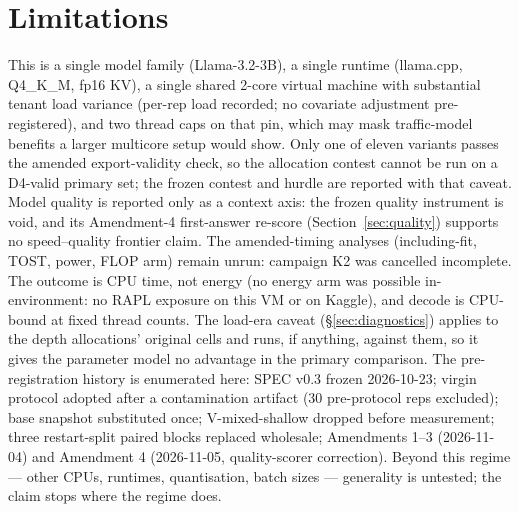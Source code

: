 \documentclass[10pt,letterpaper,twocolumn]{article}
\begin{document}
\section{Limitations}
\label{sec:limitations}
This is a single model family (Llama-3.2-3B), a single runtime
(llama.cpp, Q4\_K\_M, fp16 KV), a single shared 2-core virtual
machine with substantial tenant load variance (per-rep load recorded; no covariate adjustment pre-registered), and two
thread caps on that pin, which may mask traffic-model
benefits a larger multicore setup would show. Only one of eleven
variants passes the amended export-validity check, so the allocation contest cannot be run on a D4-valid primary set; the frozen contest and hurdle are reported with that caveat. Model quality is reported only as a context axis: the frozen quality instrument is void, and its Amendment-4 first-answer re-score (Section~\ref{sec:quality}) supports no speed--quality frontier claim. The amended-timing analyses (including-fit, TOST, power, FLOP arm) remain unrun: campaign K2 was cancelled incomplete.
The outcome is CPU time, not energy (no energy arm was possible in-environment: no RAPL exposure on this VM or on Kaggle), and decode is CPU-bound at fixed thread counts.
The load-era caveat (§\ref{sec:diagnostics}) applies to
the depth allocations' original cells and runs, if anything,
against them, so it gives the parameter model no advantage in the
primary comparison. The pre-registration history is enumerated
here: SPEC v0.3 frozen 2026-10-23; virgin protocol
adopted after a contamination artifact (30 pre-protocol reps
excluded); base snapshot substituted once; V-mixed-shallow dropped before measurement; three
restart-split paired blocks replaced wholesale; Amendments 1--3
(2026-11-04) and Amendment 4 (2026-11-05, quality-scorer
correction). Beyond this regime --- other CPUs, runtimes,
quantisation, batch sizes --- generality is untested; the claim
stops where the regime does.
\end{document}
